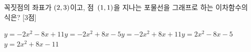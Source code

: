 꼭짓점의 좌표가 $(2{,}\mkern3mu 3)$이고, 점~$(1{,}\mkern3mu 1)$을 지나는 포물선을 그래프로 하는 이차함수의 식은? \mbox{[3점]}
\begin{choicesii}{$y=-2x^2-8x+11$}{$y=-2x^2+8x-5$}{$y=-2x^2+8x+11$}{$y=2x^2-8x-5$}{$y=2x^2+8x-11$}\end{choicesii}
